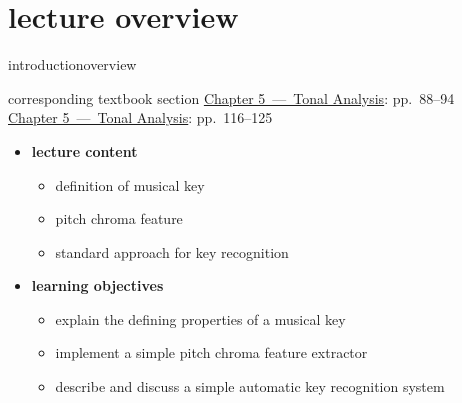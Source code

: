 




\subtitle{Module 5.7: Musical Key Recognition}


	

    \section[overview]{lecture overview}
        \begin{frame}{introduction}{overview}
            \begin{block}{corresponding textbook section}
                    \href{http://ieeexplore.ieee.org/xpl/articleDetails.jsp?arnumber=6331122}{Chapter 5~---~Tonal Analysis}: pp.~88--94\\
                    \href{http://ieeexplore.ieee.org/xpl/articleDetails.jsp?arnumber=6331122}{Chapter 5~---~Tonal Analysis}: pp.~116--125
            \end{block}

            \begin{itemize}
                \item   \textbf{lecture content}
                    \begin{itemize}
                        \item   definition of musical key
                        \item   pitch chroma feature
                        \item   standard approach for key recognition
                    \end{itemize}
                \bigskip
                \item<2->   \textbf{learning objectives}
                    \begin{itemize}
                        \item   explain the defining properties of a musical key
                        \item   implement a simple pitch chroma feature extractor
                        \item   describe and  discuss a simple automatic key recognition system
                    \end{itemize}
            \end{itemize}
        \end{frame}

